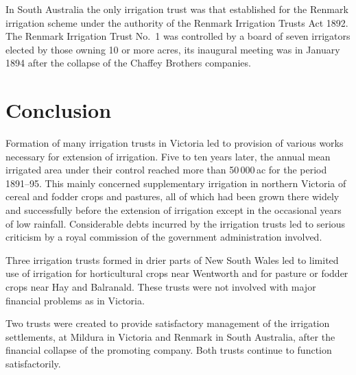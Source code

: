 In South Australia the only irrigation trust was that established for
the Renmark irrigation scheme under the authority of the Renmark
Irrigation Trusts Act 1892.  The Renmark Irrigation Trust No.~1 was
controlled by a board of seven irrigators elected by those owning 10
or more acres, its inaugural meeting was in January 1894 after the
collapse of the Chaffey Brothers companies.

\section*{Conclusion}

Formation of many irrigation trusts in Victoria led to provision of
various works necessary for extension of irrigation.  Five to ten
years later, the annual mean irrigated area under their control
reached more than 50\,000\,ac for the period 1891--95.  This mainly
concerned supplementary irrigation in northern Victoria of cereal and
fodder crops and pastures, all of which had been grown there widely
and successfully before the extension of irrigation except in the
occasional years of low rainfall.  Considerable debts incurred by the
irrigation trusts led to serious criticism by a royal commission of
the government administration involved.

Three irrigation trusts formed in drier parts of New South Wales led
to limited use of irrigation for horticultural crops near Wentworth
and for pasture or fodder crops near Hay and Balranald.  These trusts
were not involved with major financial problems as in Victoria.

Two trusts were created to provide satisfactory management of the
irrigation settlements, at Mildura in Victoria and Renmark in South
Australia, after the financial collapse of the promoting company.
Both trusts continue to function satisfactorily.

